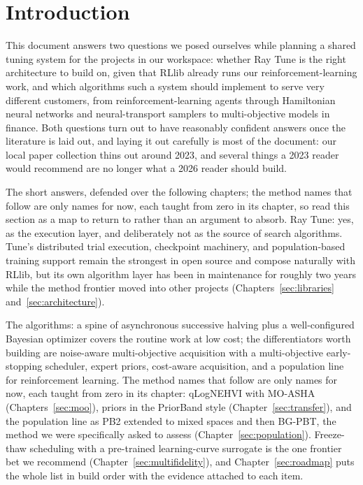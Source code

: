 \chapter{Introduction}
\label{sec:intro}

This document answers two questions we posed ourselves while planning a
shared tuning system for the projects in our workspace: whether Ray Tune
is the right architecture to build on, given that RLlib already runs our
reinforcement-learning work, and which algorithms such a system should
implement to serve very different customers, from reinforcement-learning
agents through Hamiltonian neural networks and neural-transport samplers to
multi-objective models in finance. Both questions turn out to have
reasonably confident answers once the literature is laid out, and laying
it out carefully is most of the document: our local paper collection
thins out around 2023, and several things a 2023 reader would recommend
are no longer what a 2026 reader should build.

The short answers, defended over the following chapters; the method
names that follow are only names for now, each taught from zero in its
chapter, so read this section as a map to return to rather than an
argument to absorb. Ray Tune: yes,
as the execution layer, and deliberately not as the source of search
algorithms. Tune's distributed trial execution, checkpoint machinery, and
population-based training support remain the strongest in open source and
compose naturally with RLlib, but its own algorithm layer has been in
maintenance for roughly two years while the method frontier moved into
other projects (Chapters~\ref{sec:libraries}
and~\ref{sec:architecture}).

The algorithms: a spine of asynchronous successive halving plus a
well-configured Bayesian optimizer covers the routine work at low cost;
the differentiators worth building are noise-aware multi-objective
acquisition with a multi-objective early-stopping scheduler, expert
priors, cost-aware acquisition, and a population line for reinforcement
learning. The method names that follow are only names for now, each
taught from zero in its chapter: qLogNEHVI with MO-ASHA
(Chapters~\ref{sec:moo}), priors in the PriorBand style
(Chapter~\ref{sec:transfer}), and the population line as PB2 extended to
mixed spaces and then BG-PBT, the method we were specifically asked to
assess (Chapter~\ref{sec:population}). Freeze-thaw scheduling with a
pre-trained learning-curve surrogate is the one frontier bet we recommend
(Chapter~\ref{sec:multifidelity}), and Chapter~\ref{sec:roadmap} puts
the whole list in build order with the evidence attached to each item.

